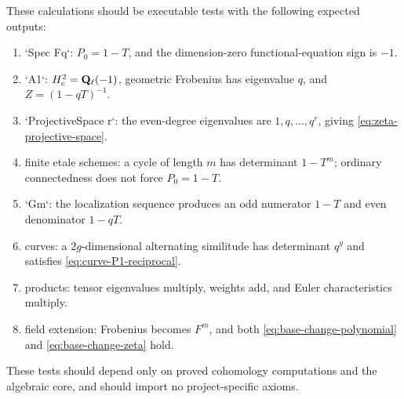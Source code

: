 \begin{formalization}
These calculations should be executable tests with the following
expected outputs:
\begin{enumerate}
\item `Spec Fq`: \(P_0=1-T\), and the dimension-zero functional-equation
      sign is \(-1\).
\item `A1`: \(H_c^2=\mathbf Q_\ell(-1)\), geometric Frobenius has eigenvalue \(q\),
      and \(Z=(1-qT)^{-1}\).
\item `ProjectiveSpace r`: the even-degree eigenvalues are
      \(1,q,\ldots,q^r\), giving \eqref{eq:zeta-projective-space}.
\item finite etale schemes: a cycle of length \(m\) has determinant
      \(1-T^m\); ordinary connectedness does not force \(P_0=1-T\).
\item `Gm`: the localization sequence produces an odd numerator
      \(1-T\) and even denominator \(1-qT\).
\item curves: a \(2g\)-dimensional alternating similitude has determinant
      \(q^g\) and satisfies \eqref{eq:curve-P1-reciprocal}.
\item products: tensor eigenvalues multiply, weights add, and Euler
      characteristics multiply.
\item field extension: Frobenius becomes \(F^m\), and both
      \eqref{eq:base-change-polynomial} and
      \eqref{eq:base-change-zeta} hold.
\end{enumerate}
These tests should depend only on proved cohomology computations and the
algebraic core, and should import no project-specific axioms.
\end{formalization}
